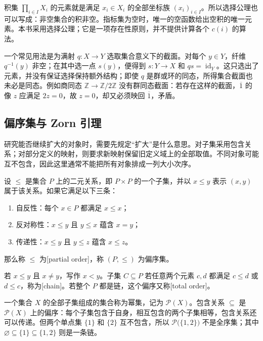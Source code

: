 \ProseParagraphBreak
积集 \(\prod_{i\in I}X_i\) 的元素就是满足 \(x_i\in X_i\) 的全部坐标族 \((x_i)_{i\in I}\)。所以选择公理也可以写成：非空集合的积非空。指标集为空时，唯一的空函数给出空积的唯一元素。本书采用选择公理；它是一项存在性原则，并不提供计算各个 \(c(i)\) 的算法。

\ProseParagraphBreak
一个常见用法是为满射 \(q:X\rightarrow Y\) 选取集合意义下的截面。对每个 \(y\in Y\)，纤维 \(q^{-1}(y)\) 非空；在其中选一点 \(s(y)\)，便得到 \(s:Y\rightarrow X\) 和 \(qs=\operatorname{id}_Y\)。这只选出了元素，并没有保证选择保持额外结构；即使 \(q\) 是群或环的同态，所得集合截面也未必是同态。例如商同态 \(\mathbb Z\rightarrow\mathbb Z/2\mathbb Z\) 没有群同态截面：若存在这样的截面，\(\overline1\) 的像 \(z\) 应满足 \(2z=0\)，故 \(z=0\)，却又必须映回 \(\overline1\)，矛盾。

\subsection{偏序集与 Zorn 引理}
\label{b1:subsec:A01:04}

研究能否继续扩大的对象时，需要先规定“扩大”是什么意思。对子集采用包含关系；对部分定义的映射，则要求新映射保留旧定义域上的全部取值。不同对象可能互不包含，因此这里通常不能把所有对象排成一列大小次序。

\begin{definition}\label{b1:def:poset-chain}
	设 \(\leq\) 是集合 \(P\) 上的二元关系，即 \(P\times P\) 的一个子集，并以 \(x\leq y\) 表示 \((x,y)\) 属于该关系。如果它满足以下三条：
	\begin{enumerate}
		\item 自反性：每个 \(x\in P\) 都满足 \(x\leq x\)；
		\item 反对称性：\(x\leq y\) 且 \(y\leq x\) 蕴含 \(x=y\)；
		\item 传递性：\(x\leq y\) 且 \(y\leq z\) 蕴含 \(x\leq z\)。
	\end{enumerate}
	那么称 \(\leq\) 为[partial order]，称 \((P,\leq)\) 为偏序集。

	若 \(x\leq y\) 且 \(x\ne y\)，写作 \(x<y\)。子集 \(C\subseteq P\) 若任意两个元素 \(c,d\) 都满足 \(c\leq d\) 或 \(d\leq c\)，称为[chain]。若整个 \(P\) 都是链，这个偏序又称[total order]。
\end{definition}

一个集合 \(X\) 的全部子集组成的集合称为幂集，记为 \(\mathcal P(X)\)。包含关系 \(\subseteq\) 是 \(\mathcal P(X)\) 上的偏序：每个子集包含于自身，相互包含的两个子集相等，包含关系还可以传递。但两个单点集 \(\{1\}\) 和 \(\{2\}\) 互不包含，所以 \(\mathcal P\bigl(\{1,2\}\bigr)\) 不是全序集；其中 \(\varnothing\subseteq\{1\}\subseteq\{1,2\}\) 则是一条链。

